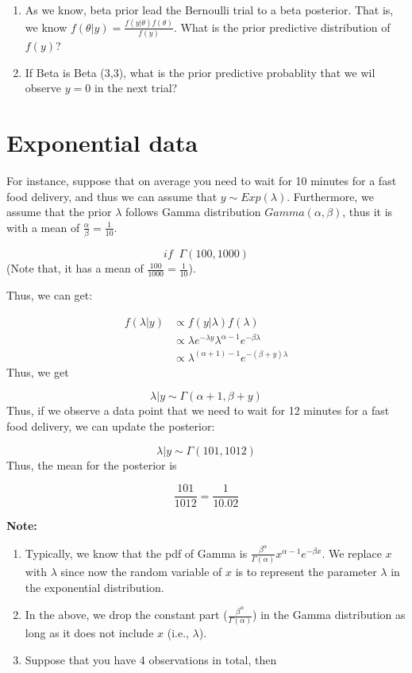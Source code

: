 \documentclass[]{book}
\begin{document}
\begin{enumerate}
\def\labelenumi{(\arabic{enumi})}
\item
  As we know, beta prior lead the Bernoulli trial to a beta posterior. That is, we know \(f(\theta|y)=\frac{f(y|\theta) f(\theta)}{f(y)}\). What is the prior predictive distribution of \(f(y)\)?
\item
  If Beta is Beta (3,3), what is the prior predictive probablity that we wil observe \(y=0\) in the next trial?
\end{enumerate}

\hypertarget{exponential-data}{%
\section{Exponential data}\label{exponential-data}}

For instance, suppose that on average you need to wait for 10 minutes for a fast food delivery, and thus we can assume that \(y \sim Exp(\lambda)\). Furthermore, we assume that the prior \(\lambda\) follows Gamma distribution \(Gamma(\alpha, \beta)\), thus it is with a mean of \(\frac{\alpha}{\beta}=\frac{1}{10}\).

\[if \; \; \Gamma (100, 1000)\]
(Note that, it has a mean of \(\frac{100}{1000}=\frac{1}{10}\)).

Thus, we can get:

\[\begin{aligned} f(\lambda | y) &\propto f(y|\lambda) f(\lambda) \\ &\propto \lambda e^{-\lambda y} \lambda^{\alpha-1}e^{-\beta \lambda} \\ &\propto \lambda^{(\alpha+1)-1} e^{-(\beta+y)\lambda } \end{aligned}\]
Thus, we get

\[\lambda |y \sim \Gamma (\alpha+1,\beta+y)\]
Thus, if we observe a data point that we need to wait for 12 minutes for a fast food delivery, we can update the posterior:

\[\lambda |y \sim \Gamma (101,1012)\]
Thus, the mean for the posterior is

\[\frac{101}{1012}=\frac{1}{10.02}\]

\textbf{Note:}

\begin{enumerate}
\def\labelenumi{(\arabic{enumi})}
\item
  Typically, we know that the pdf of Gamma is \(\frac{\beta^{\alpha}}{\Gamma(\alpha)}x^{\alpha-1}e^{-\beta x}\). We replace \(x\) with \(\lambda\) since now the random variable of \(x\) is to represent the parameter \(\lambda\) in the exponential distribution.
\item
  In the above, we drop the constant part (\(\frac{\beta^{\alpha}}{\Gamma(\alpha)}\)) in the Gamma distribution as long as it does not include \(x\) (i.e., \(\lambda\)).
\item
  Suppose that you have 4 observations in total, then
\end{enumerate}
\end{document}
